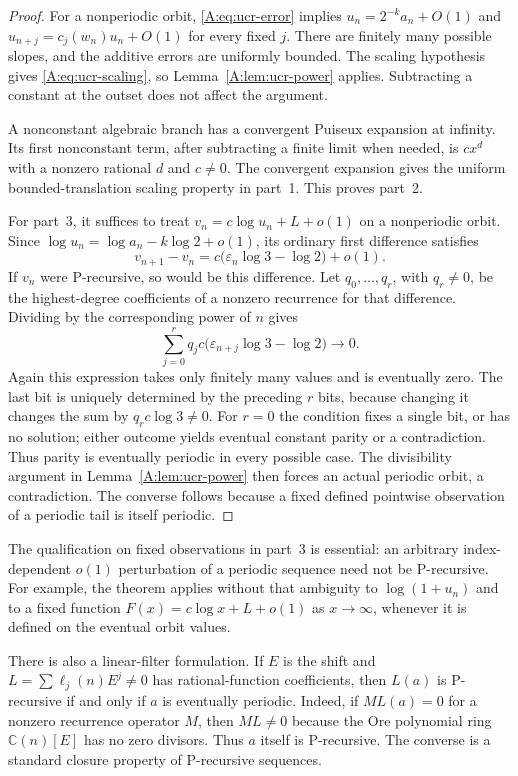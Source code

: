 \documentclass[11pt,a4paper]{article}
\theoremstyle{definition}
\theoremstyle{remark}
\numberwithin{equation}{section}
\begin{document}
\begin{proof}
For a nonperiodic orbit, \eqref{A:eq:ucr-error} implies
$u_n=2^{-k}a_n+O(1)$ and
$u_{n+j}=c_j(w_n)u_n+O(1)$ for every fixed $j$.
There are finitely many possible slopes, and the additive errors are
uniformly bounded. The scaling hypothesis gives
\eqref{A:eq:ucr-scaling}, so Lemma~\ref{A:lem:ucr-power} applies.
Subtracting a constant at the outset does not affect the argument.

A nonconstant algebraic branch has a convergent Puiseux expansion at
infinity. Its first nonconstant term, after subtracting a finite limit
when needed, is $cx^d$ with a nonzero rational $d$ and $c\ne0$.
The convergent expansion gives the uniform bounded-translation scaling
property in part~1. This proves part~2.

For part~3, it suffices to treat
$v_n=c\log u_n+L+o(1)$ on a nonperiodic orbit.
Since $\log u_n=\log a_n-k\log2+o(1)$, its ordinary first difference
satisfies
\[
 v_{n+1}-v_n
 =c\bigl(\varepsilon_n\log3-\log2\bigr)+o(1).
\]
If $v_n$ were P-recursive, so would be this difference.
Let $q_0,\ldots,q_r$, with $q_r\ne0$, be the highest-degree
coefficients of a nonzero recurrence for that difference.
Dividing by the corresponding power of $n$ gives
\[
 \sum_{j=0}^r q_j c
 \bigl(\varepsilon_{n+j}\log3-\log2\bigr)\longrightarrow0.
\]
Again this expression takes only finitely many values and is eventually
zero. The last bit is uniquely determined by the preceding $r$ bits,
because changing it changes the sum by $q_rc\log3\ne0$.
For $r=0$ the condition fixes a single bit, or has no solution;
either outcome yields eventual constant parity or a contradiction.
Thus parity is eventually periodic in every possible case.
The divisibility argument in Lemma~\ref{A:lem:ucr-power} then forces an
actual periodic orbit, a contradiction.
The converse follows because a fixed defined pointwise observation of
a periodic tail is itself periodic.
\end{proof}

The qualification on fixed observations in part~3 is essential: an
arbitrary index-dependent $o(1)$ perturbation of a periodic sequence need
not be P-recursive. For example, the theorem applies without that
ambiguity to $\log(1+u_n)$ and to a fixed function
$F(x)=c\log x+L+o(1)$ as $x\to\infty$, whenever it is defined on the
eventual orbit values.

There is also a linear-filter formulation. If $E$ is the shift and
$L=\sum\ell_j(n)E^j\ne0$ has rational-function coefficients, then
$L(a)$ is P-recursive if and only if $a$ is eventually periodic.
Indeed, if $M L(a)=0$ for a nonzero recurrence operator $M$, then
$ML\ne0$ because the Ore polynomial ring $\mathbb C(n)[E]$ has no zero
divisors. Thus $a$ itself is P-recursive. The converse is a standard
closure property of P-recursive sequences.
\end{document}
